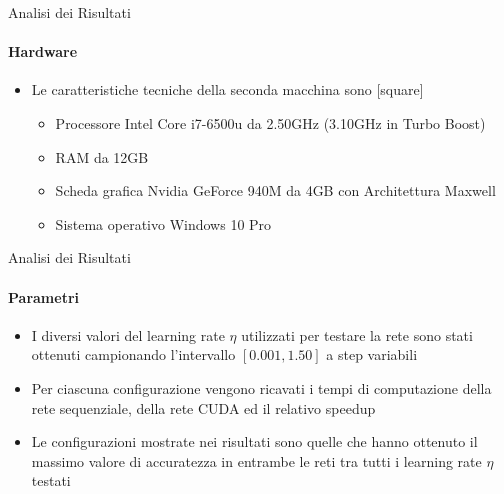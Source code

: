 \documentclass[
 ]{beamer}
\begin{document}
\begin{frame}{Analisi dei Risultati}
    \framesubtitle{Hardware}
    \smallskip
    \begin{itemize} [<+->]
        \setlength\itemsep{2em}
        \item \large Le caratteristiche tecniche della seconda macchina sono            
        \bigskip
        [square] 
        \begin{itemize} [<+->] 
        \setlength\itemsep{2.5em}
            \item \large Processore Intel Core i7-6500u da 2.50GHz (3.10GHz in Turbo Boost)
            \item \large RAM da 12GB
            \item \large Scheda grafica Nvidia GeForce 940M da 4GB con Architettura Maxwell
            \item \large Sistema operativo Windows 10 Pro                    
        \end{itemize}        
    \end{itemize}     
\end{frame}

\begin{frame}{Analisi dei Risultati}
    \framesubtitle{Parametri}
    \smallskip
    \begin{itemize} [<+->]
        \setlength\itemsep{2.5em}
        \item \large I diversi valori del learning rate $\eta$ utilizzati per testare la rete sono stati ottenuti campionando l'intervallo $[0.001, 1.50]$ a step variabili
        \item \large Per ciascuna configurazione vengono ricavati i tempi di computazione della rete sequenziale, della rete CUDA ed il relativo speedup
        \item \large Le configurazioni mostrate nei risultati sono quelle che hanno ottenuto il massimo valore di accuratezza in entrambe le reti tra tutti i learning rate $\eta$ testati
    \end{itemize}     
\end{frame}


\end{document}
